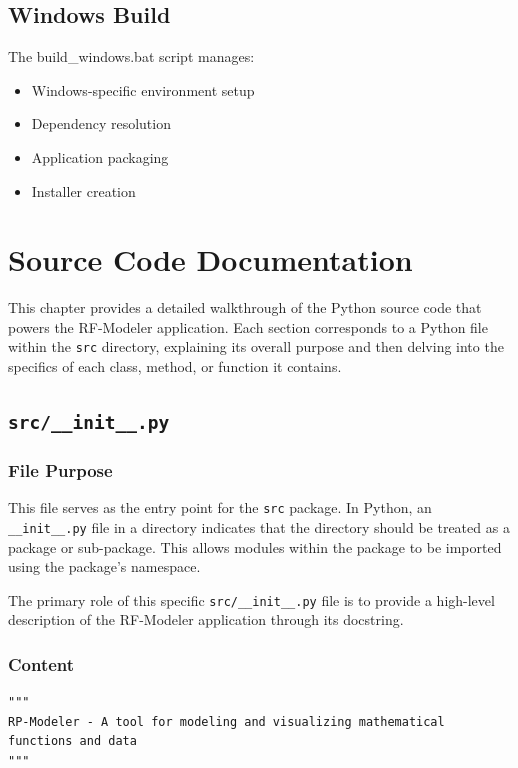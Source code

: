 \documentclass[12pt,a4paper]{report}
\begin{document}
\section{Windows Build}
The build\_windows.bat script manages:
\begin{itemize}
    \item Windows-specific environment setup
    \item Dependency resolution
    \item Application packaging
    \item Installer creation
\end{itemize}

\chapter{Source Code Documentation}
\label{cha:source_code_documentation}
This chapter provides a detailed walkthrough of the Python source code that powers the RF-Modeler application. Each section corresponds to a Python file within the \texttt{src} directory, explaining its overall purpose and then delving into the specifics of each class, method, or function it contains.

\section{\texttt{src/\_\_init\_\_.py}}
\subsection{File Purpose}
This file serves as the entry point for the \texttt{src} package. In Python, an \texttt{\_\_init\_\_.py} file in a directory indicates that the directory should be treated as a package or sub-package. This allows modules within the package to be imported using the package's namespace.

The primary role of this specific \texttt{src/\_\_init\_\_.py} file is to provide a high-level description of the RF-Modeler application through its docstring.

\subsection{Content}
\begin{verbatim}
"""
RP-Modeler - A tool for modeling and visualizing mathematical functions and data
"""
\end{verbatim}
\end{document}
